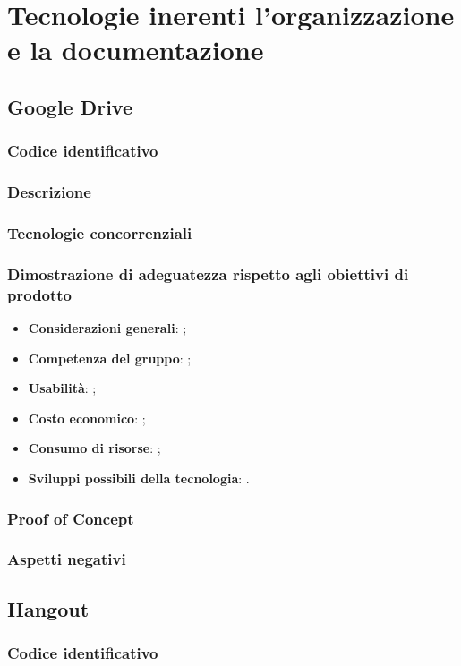 \documentclass[./../Technology Baseline.tex]{subfiles}
\begin{document}
\section{Tecnologie inerenti l'organizzazione e la documentazione}

\subsection{Google Drive}

\subsubsection{Codice identificativo}
\subsubsection{Descrizione}
\subsubsection{Tecnologie concorrenziali}
\subsubsection{Dimostrazione di adeguatezza rispetto agli obiettivi di prodotto}
\begin{itemize}
	\item \textbf{Considerazioni generali}: ;
	\item \textbf{Competenza del gruppo}: ;
	\item \textbf{Usabilità}: ;
	\item \textbf{Costo economico}: ;
	\item \textbf{Consumo di risorse}: ;
	\item \textbf{Sviluppi possibili della tecnologia}: .
\end{itemize}
\subsubsection{Proof of Concept}
\subsubsection{Aspetti negativi}

\subsection{Hangout}

\subsubsection{Codice identificativo}
\end{document}
